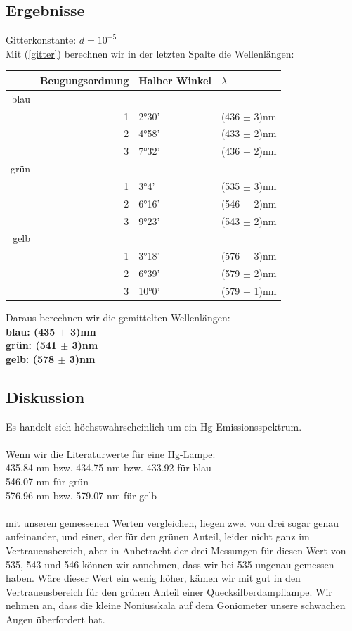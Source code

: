 \documentclass{article}
\begin{document}
\subsection{Ergebnisse}
Gitterkonstante: $d=10^{-5}$\\
Mit (\ref{gitter}) berechnen wir in der letzten Spalte die Wellenlängen:
\begin{center}
\begin{tabular}{|r|r|l|l|}
\hline
& Beugungsordnung & Halber Winkel & $\lambda$\\
\hline
\hline
blau & & &\\
& 1 & 2°30' & (436 $\pm$ 3)nm\\
& 2 & 4°58' & (433 $\pm$ 2)nm\\
& 3 & 7°32' & (436 $\pm$ 2)nm\\
\hline
grün & & &\\
& 1 & 3°4' & (535 $\pm$ 3)nm\\
& 2 & 6°16' & (546 $\pm$ 2)nm\\
& 3 & 9°23' & (543 $\pm$ 2)nm\\
\hline
gelb & & &\\
& 1 & 3°18' & (576 $\pm$ 3)nm\\
& 2 & 6°39' & (579 $\pm$ 2)nm\\
& 3 & 10°0' & (579 $\pm$ 1)nm\\
\hline
\end{tabular}
\end{center}
\vspace{0.8cm}

Daraus berechnen wir die gemittelten Wellenlängen:\\
\textbf{blau: (435 $\pm$ 3)nm}\\
\textbf{grün: (541 $\pm$ 3)nm}\\
\textbf{gelb: (578 $\pm$ 3)nm}\\

\subsection{Diskussion}
Es handelt sich höchstwahrscheinlich um ein Hg-Emissionsspektrum.\\
\\
Wenn wir die 
Literaturwerte für eine Hg-Lampe:\\
435.84 nm bzw. 434.75 nm bzw. 433.92 für blau\\
546.07 nm für grün\\
576.96 nm bzw. 579.07 nm für gelb\\
\\
mit unseren gemessenen Werten vergleichen, liegen zwei von drei sogar genau aufeinander, und einer, der für den grünen Anteil, leider nicht ganz im Vertrauensbereich, aber in Anbetracht der drei Messungen für diesen Wert von 535, 543 und 546 können wir annehmen, dass wir bei 535 ungenau gemessen haben. Wäre dieser Wert ein wenig höher, kämen wir mit gut in den Vertrauensbereich für den grünen Anteil einer Quecksilberdampflampe. Wir nehmen an, dass die kleine Noniusskala auf dem Goniometer unsere schwachen Augen überfordert hat.
\end{document}
